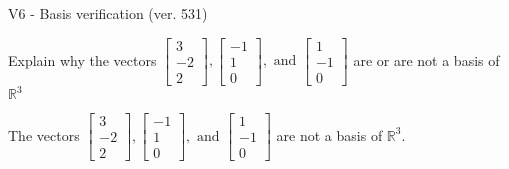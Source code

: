 \begin{exercise}
  \begin{exerciseTitle}V6 - Basis verification (ver. 531)\end{exerciseTitle}
  \begin{exerciseStatement}
    Explain why the vectors \(\left[\begin{array}{r}
3 \\
-2 \\
2
\end{array}\right] , \left[\begin{array}{r}
-1 \\
1 \\
0
\end{array}\right] , \text{ and } \left[\begin{array}{r}
1 \\
-1 \\
0
\end{array}\right]\) are or are not a basis of \(\mathbb{R}^3\)	


  \end{exerciseStatement}
  \begin{exerciseAnswer}
   The vectors \(\left[\begin{array}{r}
3 \\
-2 \\
2
\end{array}\right] , \left[\begin{array}{r}
-1 \\
1 \\
0
\end{array}\right] , \text{ and } \left[\begin{array}{r}
1 \\
-1 \\
0
\end{array}\right]\) 
  	 are not  a basis of \(\mathbb{R}^3\).
  


  \end{exerciseAnswer}
\end{exercise}